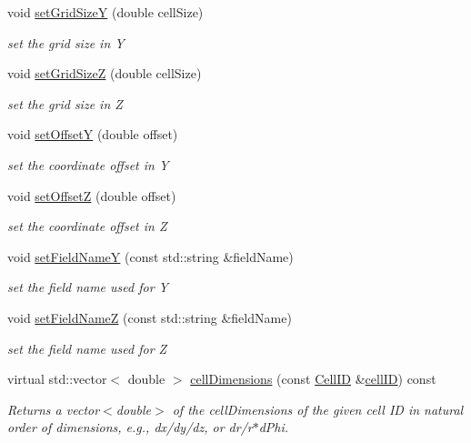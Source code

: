 \begin{DoxyCompactItemize}
void \hyperlink{class_d_d4hep_1_1_d_d_segmentation_1_1_cartesian_grid_y_z_a0062b881400bc655da7f75720d27af7b}{set\+Grid\+SizeY} (double cell\+Size)
\begin{DoxyCompactList}\small\item\em set the grid size in Y \end{DoxyCompactList}\item 
void \hyperlink{class_d_d4hep_1_1_d_d_segmentation_1_1_cartesian_grid_y_z_a96633e1fe0220512513a35ad41136b6d}{set\+Grid\+SizeZ} (double cell\+Size)
\begin{DoxyCompactList}\small\item\em set the grid size in Z \end{DoxyCompactList}\item 
void \hyperlink{class_d_d4hep_1_1_d_d_segmentation_1_1_cartesian_grid_y_z_acc72b1c4ab17cebf45e596f6afaf5f2e}{set\+OffsetY} (double offset)
\begin{DoxyCompactList}\small\item\em set the coordinate offset in Y \end{DoxyCompactList}\item 
void \hyperlink{class_d_d4hep_1_1_d_d_segmentation_1_1_cartesian_grid_y_z_a396883c33c1eb30aac6e5dc2c21a7f66}{set\+OffsetZ} (double offset)
\begin{DoxyCompactList}\small\item\em set the coordinate offset in Z \end{DoxyCompactList}\item 
void \hyperlink{class_d_d4hep_1_1_d_d_segmentation_1_1_cartesian_grid_y_z_abd0b24749554d02acb6fb5ffa5e15335}{set\+Field\+NameY} (const std\+::string \&field\+Name)
\begin{DoxyCompactList}\small\item\em set the field name used for Y \end{DoxyCompactList}\item 
void \hyperlink{class_d_d4hep_1_1_d_d_segmentation_1_1_cartesian_grid_y_z_ad6d2428895d3f1842bd4d6add72658d2}{set\+Field\+NameZ} (const std\+::string \&field\+Name)
\begin{DoxyCompactList}\small\item\em set the field name used for Z \end{DoxyCompactList}\item 
virtual std\+::vector$<$ double $>$ \hyperlink{class_d_d4hep_1_1_d_d_segmentation_1_1_cartesian_grid_y_z_a60fd1dd0468b6edb24054f83c0e15445}{cell\+Dimensions} (const \hyperlink{namespace_d_d4hep_1_1_d_d_segmentation_ac7af071d85cb48820914434a07e21ba1}{Cell\+ID} \&\hyperlink{class_d_d4hep_1_1_d_d_segmentation_1_1_cartesian_grid_y_z_a20f6a732320e5d4b73643c3d8784ba7b}{cell\+ID}) const
\begin{DoxyCompactList}\small\item\em Returns a vector$<$double$>$ of the cell\+Dimensions of the given cell ID in natural order of dimensions, e.\+g., dx/dy/dz, or dr/r$\ast$d\+Phi. \end{DoxyCompactList}\end{DoxyCompactItemize}
